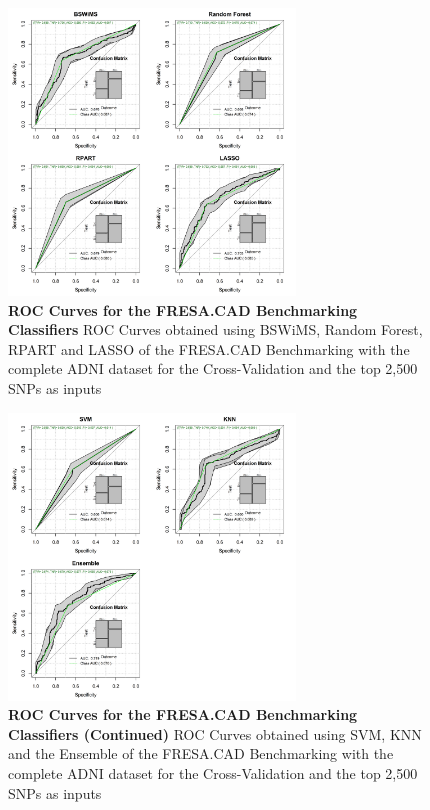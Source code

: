  \begin{figure}[!ht]
\centerline{\includegraphics[width=3in]{images/results/fresaCurves1.png}}
\caption{{\bf ROC Curves for the FRESA.CAD Benchmarking Classifiers} 
ROC Curves obtained using BSWiMS, Random Forest, RPART and LASSO of the FRESA.CAD Benchmarking with the complete ADNI dataset for the Cross-Validation and the top 2,500 SNPs as inputs}
\label{fig14}
\end{figure}

 \begin{figure}[!ht]
\centerline{\includegraphics[width=3in]{images/results/fresaCurves2.png}}
\caption{{\bf ROC Curves for the FRESA.CAD Benchmarking Classifiers (Continued)} 
ROC Curves obtained using SVM, KNN and the Ensemble of the FRESA.CAD Benchmarking with the complete ADNI dataset for the Cross-Validation and the top 2,500 SNPs as inputs}
\label{fig141}
\end{figure}

